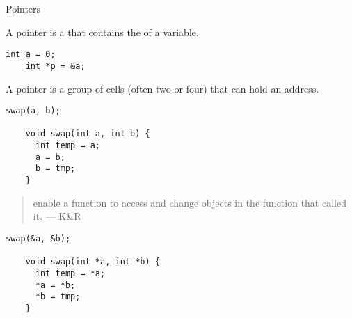 \begin{frame}{}
  \centerline{\LARGE Pointers}
\end{frame}

\begin{frame}[fragile]{}
  \begin{definition}[Pointers (K\&R)]
    A pointer is a  that contains the  of a variable.
  \end{definition}

  \vspace{0.50cm}
  \begin{lstlisting}[style = Cstyle]
    int a = 0;
    int *p = &a;
  \end{lstlisting}

  \vspace{0.50cm}
  \pause
  \begin{definition}
    A pointer is a group of cells (often two or four) that can hold an address.
  \end{definition}
\end{frame}

\begin{frame}[fragile]{}
  \begin{lstlisting}[style = Cstyle]
    swap(a, b);

    void swap(int a, int b) {
      int temp = a;
      a = b;
      b = tmp;
    }
  \end{lstlisting}

  \pause
  \begin{quote}
     enable a function to access and change objects
    in the function that called it.  \hfill --- K\&R
  \end{quote}

  \pause
  \begin{lstlisting}[style = Cstyle]
    swap(&a, &b);

    void swap(int *a, int *b) {
      int temp = *a;
      *a = *b;
      *b = tmp;
    }
  \end{lstlisting}
\end{frame}
